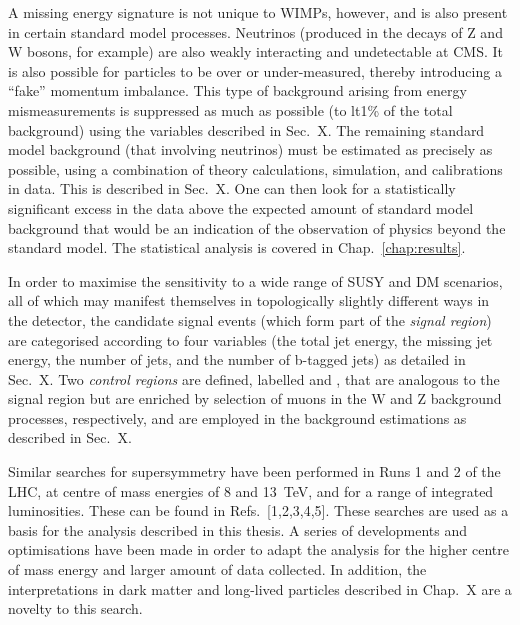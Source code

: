 A missing energy signature is not unique to WIMPs, however, and is also present 
in certain standard model processes. Neutrinos (produced in the decays of Z and 
W bosons, for example) are also weakly interacting and undetectable at CMS. It 
is also possible for particles to be over or under-measured, thereby 
introducing a ``fake'' momentum imbalance. This type of background arising from 
energy mismeasurements is suppressed as much as possible (to lt1\% of the total 
background) using the variables described in Sec.~X. The remaining standard 
model background (that involving neutrinos) must be estimated as precisely as 
possible, using a combination of theory calculations, simulation, and 
calibrations in data. This is described in Sec.~X. One can then look for a 
statistically significant excess in the data above the expected amount of 
standard model background that would be an indication of the observation of 
physics beyond the standard model. The statistical analysis is covered in 
Chap.~\ref{chap:results}.

In order to maximise the sensitivity to a wide range of SUSY and DM scenarios, 
all of which may manifest themselves in topologically slightly different ways 
in the detector, the candidate signal events (which form part of the 
\textit{signal region}) are categorised according to four variables (the total 
jet energy, the missing jet energy, the number of jets, and the number of 
b-tagged jets) as detailed 
in Sec.~X. Two \textit{control regions} are defined, labelled \mj and 
\mmj, that are analogous to the signal region but are enriched by 
selection of muons in the W and Z background processes, respectively, and are 
employed in the background estimations as described in Sec.~X.

Similar searches for supersymmetry have been performed in Runs 1 and 2 of the 
LHC, at centre of mass energies of 8 and 13~TeV, and for a range of 
integrated luminosities. These can be found in Refs.~[1,2,3,4,5]. These 
searches are used as a basis for the analysis described in this thesis. A 
series of developments and optimisations have been made in order to adapt the 
analysis for the higher centre of mass energy and larger amount of data 
collected. In addition, the interpretations in dark matter and long-lived 
particles described in Chap.~X are a novelty to this search.



